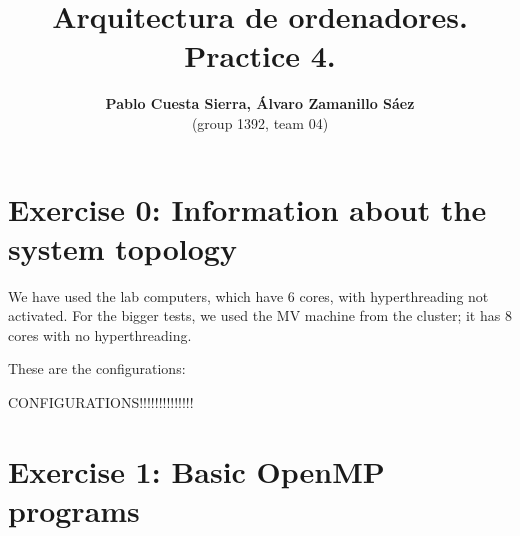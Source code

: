 \documentclass{article}
\begin{document}
\title{\textbf{Arquitectura de ordenadores. Practice 4.}}
\author{\textbf{Pablo Cuesta Sierra, Álvaro Zamanillo Sáez}\\(group 1392, team 04)}
\maketitle

\begin{tcolorbox}
\tableofcontents
\end{tcolorbox}


\newpage
\section{Exercise 0: Information about the system topology}

We have used the lab computers, which have 6 cores, with hyperthreading not activated.
For the bigger tests, we used the MV machine from the cluster; it has 8 cores with no hyperthreading.

These are the configurations:


CONFIGURATIONS!!!!!!!!!!!!!!

\section{Exercise 1: Basic OpenMP programs}
\end{document}
